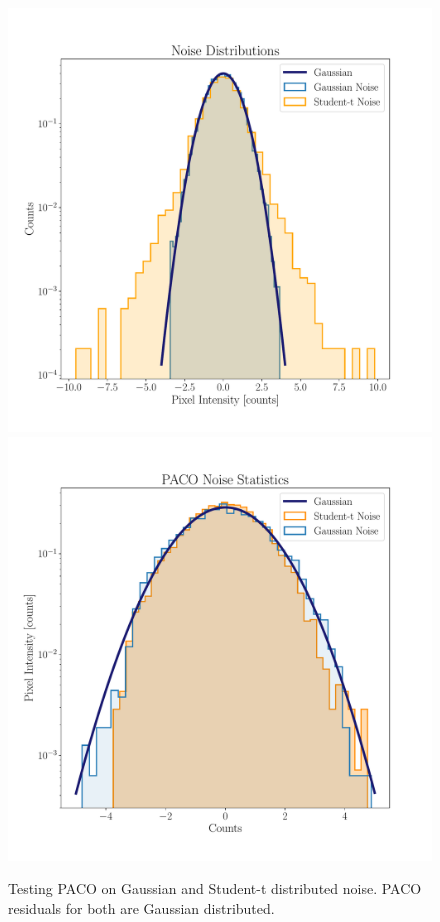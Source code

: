 \documentclass[twocolumn,fleqn]{aastex62}
\begin{document}
\begin{figure}[h]
	\centering
	\includegraphics[width=\linewidth]{prepacostats}
	\includegraphics[width=\linewidth]{PACONoise}
	\caption{\label{fig:processed} Testing PACO on Gaussian and Student-t distributed noise. PACO residuals for both are Gaussian distributed.}
\end{figure}
\end{document}
